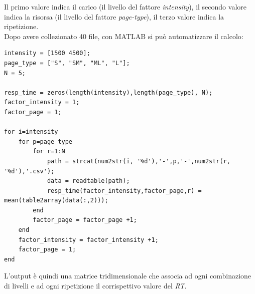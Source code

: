 Il primo valore indica il carico (il livello del fattore \textit{intensity}), il secondo valore indica la risorsa (il livello del fattore \textit{page-type}), il terzo valore indica la ripetizione.
\\Dopo avere collezionato 40 file, con MATLAB si può automatizzare il calcolo:
\begin{verbatim}
intensity = [1500 4500]; 
page_type = ["S", "SM", "ML", "L"];
N = 5;

resp_time = zeros(length(intensity),length(page_type), N);
factor_intensity = 1;
factor_page = 1;

for i=intensity
	for p=page_type
		for r=1:N
			path = strcat(num2str(i, '%d'),'-',p,'-',num2str(r, '%d'),'.csv');
			data = readtable(path);
			resp_time(factor_intensity,factor_page,r) = mean(table2array(data(:,2)));
		end
		factor_page = factor_page +1;
	end
	factor_intensity = factor_intensity +1;
	factor_page = 1;
end
\end{verbatim}
L'output è quindi una matrice tridimensionale che associa ad ogni combinazione di livelli e ad ogni ripetizione il corrispettivo valore del \textit{RT}.

